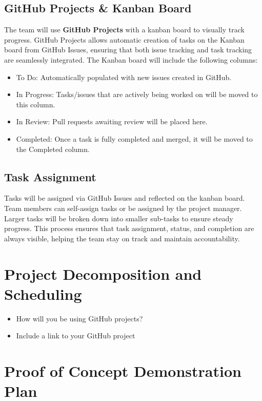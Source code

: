 \documentclass{article}
\begin{document}
\subsection{GitHub Projects \& Kanban Board}
The team will use \textbf{GitHub Projects} with a kanban board to visually track progress. GitHub Projects allows automatic creation of tasks on the Kanban board from GitHub Issues, ensuring that both issue tracking and task tracking are seamlessly integrated. The Kanban board will include the following columns:
\begin{itemize}
    \item To Do: Automatically populated with new issues created in GitHub.
    \item In Progress: Tasks/issues that are actively being worked on will be moved to this column.
    \item In Review: Pull requests awaiting review will be placed here.
    \item Completed: Once a task is fully completed and merged, it will be moved to the Completed column.
\end{itemize}

\subsection{Task Assignment}
Tasks will be assigned via GitHub Issues and reflected on the kanban board. Team members can self-assign tasks or be assigned by the project manager. Larger tasks will be broken down into smaller sub-tasks to ensure steady progress. This process ensures that task assignment, status, and completion are always visible, helping the team stay on track and maintain accountability.


\section{Project Decomposition and Scheduling}

\begin{itemize}
  \item How will you be using GitHub projects?
  \item Include a link to your GitHub project
\end{itemize}


\section{Proof of Concept Demonstration Plan}
\end{document}
